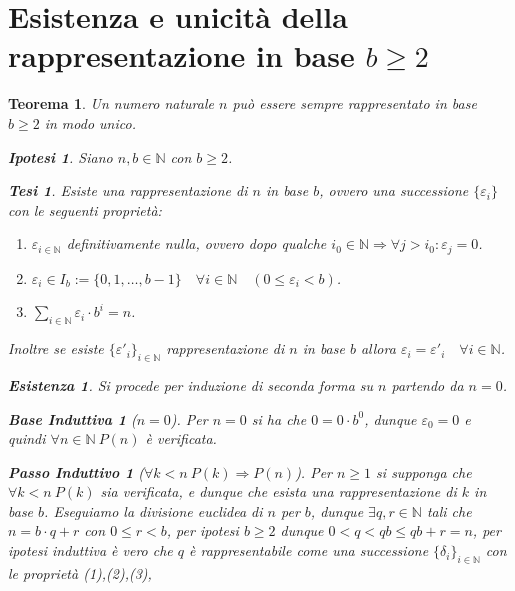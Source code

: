 \documentclass{article}
\makeatletter
\renewenvironment{proof}[1][\proofname]{\par
    \pushQED{\qed}%
    \normalfont \topsep6\p@\@plus6\p@\relax
    \trivlist
    \item\relax
    {\itshape
    #1\@addpunct{.}}\hspace\labelsep\ignorespaces
    }{%
    \popQED\endtrivlist\@endpefalse
}
\newtheorem{theorem}{Teorema}[part]
\newtheorem{ipothesis}[lemma]{Ipotesi}
\newtheorem{thesis}[lemma]{Tesi}
\theoremstyle{definition}
\newtheorem*{existence}{Esistenza}
\newtheorem*{base}{Base Induttiva}
\newtheorem*{step}{Passo Induttivo}
\makeatother
\begin{document}
\section{Esistenza e unicità della rappresentazione in base \texorpdfstring{\(b\ge 2\)}{b>=2}}
\begin{theorem}
    Un numero naturale \(n\) può essere sempre rappresentato in base \(b\ge 2\) in modo unico.
    \begin{ipothesis}
        Siano \(n,b\in\mathbb{N}\) con \(b\ge 2\).
    \end{ipothesis}
    \begin{thesis}
        Esiste una rappresentazione di \(n\) in base \(b\), ovvero una successione \(\{\varepsilon_i\}\) con le seguenti proprietà:
        \begin{enumerate}
            \item \(\varepsilon_{i\in\mathbb{N}}\) definitivamente nulla, ovvero dopo qualche \(i_0\in\mathbb{N}\Rightarrow \forall j>i_0: \varepsilon_j=0\).
            \item \(\varepsilon_i\in I_b:=\{0,1,\ldots,b-1\}\quad \forall i\in\mathbb{N}\quad (0\leq\varepsilon_i< b)\).
            \item \(\displaystyle\sum_{i\in\mathbb{N}} \varepsilon_i\cdot b^i=n\).
        \end{enumerate}
        Inoltre se esiste \(\{\varepsilon'_i\}_{i\in\mathbb{N}}\) rappresentazione di \(n\) in base \(b\) allora \(\varepsilon_i=\varepsilon'_i\quad \forall i\in\mathbb{N}\).
    \end{thesis}
    \begin{proof} 
        \begin{existence}
            Si procede per induzione di seconda forma su \(n\) partendo da \(n=0\).
            \begin{base}[$n=0$] 
                Per \(n=0\) si ha che \(0=0\cdot b^0\), dunque \(\varepsilon_0=0\) e quindi \(\forall n\in\mathbb{N}\ P(n)\) è verificata.\end{base}
            \begin{step}[$\forall k<n\ P(k)\Rightarrow P(n)$]
                Per \(n\geq 1\) si supponga che \(\forall k<n\ P(k)\) sia verificata, e dunque che esista una rappresentazione di \(k\) in base \(b\). Eseguiamo la divisione euclidea di \(n\) per \(b\), dunque \(\exists q,r\in\mathbb{N}\) tali che \(n=b\cdot q+r\) con \(0\leq r<b\), per ipotesi \(b\geq 2\) dunque \(0<q<qb\leq qb+r=n\),
                per ipotesi induttiva è vero che \(q\) è rappresentabile come una successione \(\{\delta_i\}_{i\in\mathbb{N}}\) con le proprietà (1),(2),(3),

\end{step}
\end{existence}
\end{proof}
\end{theorem}
\end{document}
